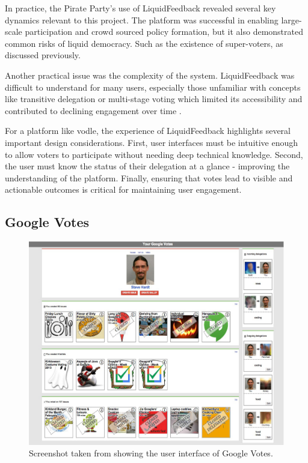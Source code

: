 In practice, the Pirate Party's use of LiquidFeedback revealed several key dynamics relevant to this project. The platform was successful in enabling large-scale participation and crowd sourced policy formation, but it also demonstrated common risks of liquid democracy. Such as the existence of super-voters, as discussed previously.

Another practical issue was the complexity of the system. LiquidFeedback was difficult to understand for many users, especially those unfamiliar with concepts like transitive delegation or multi-stage voting which limited its accessibility and contributed to declining engagement over time \citep{kling2015votingbehaviourpoweronline}.

For a platform like vodle, the experience of LiquidFeedback highlights several important design considerations. First, user interfaces must be intuitive enough to allow voters to participate without needing deep technical knowledge. Second, the user must know the status of their delegation at a glance - improving the understanding of the platform. Finally, ensuring that votes lead to visible and actionable outcomes is critical for maintaining user engagement.

\subsection{Google Votes}
\begin{figure}[H]
  \centering
  \includegraphics[width=0.8\linewidth]{../common/google_votes.png}
  \caption{Screenshot taken from \citet{hardt_google_2015} showing the user interface of Google Votes.}
\end{figure}

